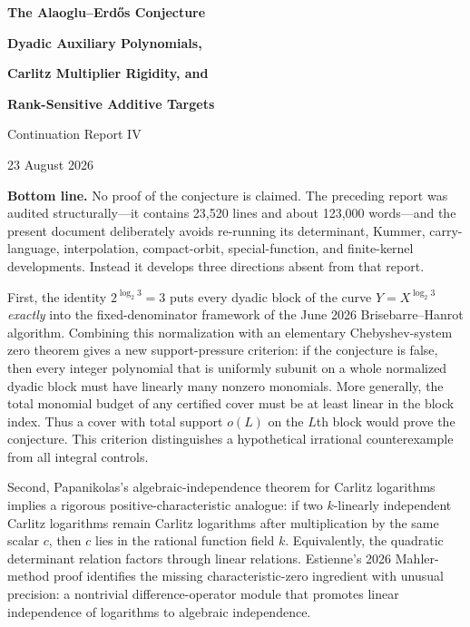 \documentclass[11pt,oneside]{article}
\theoremstyle{definition}
\theoremstyle{remark}
\begin{document}

\begin{titlepage}
\centering
\vspace*{0.6cm}
{\Huge\bfseries The Alaoglu--Erd\H{o}s Conjecture\par}
\vspace{0.45cm}
{\LARGE\bfseries Dyadic Auxiliary Polynomials,\par}
\vspace{0.12cm}
{\LARGE\bfseries Carlitz Multiplier Rigidity, and\par}
\vspace{0.12cm}
{\LARGE\bfseries Rank-Sensitive Additive Targets\par}
\vspace{0.75cm}
{\Large Continuation Report IV\par}
\vspace{0.25cm}
{\large 23 August 2026\par}
\vfill
\begin{minipage}{0.92\textwidth}
\small
\textbf{Bottom line.}
No proof of the conjecture is claimed.  The preceding report was audited structurally---it
contains 23,520 lines and about 123,000 words---and the present document deliberately avoids
re-running its determinant, Kummer, carry-language, interpolation, compact-orbit, special-function,
and finite-kernel developments.  Instead it develops three directions absent from that report.

First, the identity $2^{\log_2 3}=3$ puts every dyadic block of the curve
$Y=X^{\log_2 3}$ \emph{exactly} into the fixed-denominator framework of the June 2026
Brisebarre--Hanrot algorithm.  Combining this normalization with an elementary Chebyshev-system
zero theorem gives a new support-pressure criterion: if the conjecture is false, then every
integer polynomial that is uniformly subunit on a whole normalized dyadic block must have
linearly many nonzero monomials.  More generally, the total monomial budget of any certified
cover must be at least linear in the block index.  Thus a cover with total support $o(L)$ on the
$L$th block would prove the conjecture.  This criterion distinguishes a hypothetical irrational
counterexample from all integral controls.

Second, Papanikolas's algebraic-independence theorem for Carlitz logarithms implies a rigorous
positive-characteristic analogue: if two $k$-linearly independent Carlitz logarithms remain
Carlitz logarithms after multiplication by the same scalar $c$, then $c$ lies in the rational
function field $k$.  Equivalently, the quadratic determinant relation factors through linear
relations.  Estienne's 2026 Mahler-method proof identifies the missing characteristic-zero
ingredient with unusual precision: a nontrivial difference-operator module that promotes
linear independence of logarithms to algebraic independence.


\end{minipage}
\end{titlepage}
\end{document}
